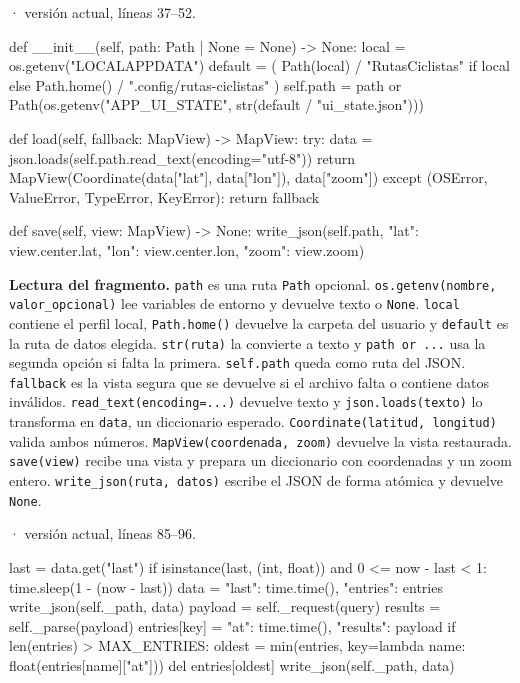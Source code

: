 \documentclass[11pt,a4paper]{article}
\begin{document}
\smallskip
{\footnotesize\texttt{} · versión actual, líneas 37--52.}\par
\begin{Codigo}[firstnumber=37]
    def __init__(self, path: Path | None = None) -> None:
        local = os.getenv("LOCALAPPDATA")
        default = (
            Path(local) / "RutasCiclistas" if local else Path.home() / ".config/rutas-ciclistas"
        )
        self.path = path or Path(os.getenv("APP_UI_STATE", str(default / "ui_state.json")))

    def load(self, fallback: MapView) -> MapView:
        try:
            data = json.loads(self.path.read_text(encoding="utf-8"))
            return MapView(Coordinate(data["lat"], data["lon"]), data["zoom"])
        except (OSError, ValueError, TypeError, KeyError):
            return fallback

    def save(self, view: MapView) -> None:
        write_json(self.path, {"lat": view.center.lat, "lon": view.center.lon, "zoom": view.zoom})
\end{Codigo}

\textbf{Lectura del fragmento.} \texttt{path} es una ruta \texttt{Path} opcional. \texttt{os.getenv(nombre, valor\_opcional)} lee variables de entorno y devuelve texto o \texttt{None}. \texttt{local} contiene el perfil local, \texttt{Path.home()} devuelve la carpeta del usuario y \texttt{default} es la ruta de datos elegida. \texttt{str(ruta)} la convierte a texto y \texttt{path or ...} usa la segunda opción si falta la primera. \texttt{self.path} queda como ruta del JSON. \texttt{fallback} es la vista segura que se devuelve si el archivo falta o contiene datos inválidos. \texttt{read\_text(encoding=...)} devuelve texto y \texttt{json.loads(texto)} lo transforma en \texttt{data}, un diccionario esperado. \texttt{Coordinate(latitud, longitud)} valida ambos números. \texttt{MapView(coordenada, zoom)} devuelve la vista restaurada. \texttt{save(view)} recibe una vista y prepara un diccionario con coordenadas y un zoom entero. \texttt{write\_json(ruta, datos)} escribe el JSON de forma atómica y devuelve \texttt{None}.


\smallskip
{\footnotesize\texttt{} · versión actual, líneas 85--96.}\par
\begin{Codigo}[firstnumber=85]
                last = data.get("last")
                if isinstance(last, (int, float)) and 0 <= now - last < 1:
                    time.sleep(1 - (now - last))
                data = {"last": time.time(), "entries": entries}
                write_json(self._path, data)
                payload = self._request(query)
                results = self._parse(payload)
                entries[key] = {"at": time.time(), "results": payload}
                if len(entries) > MAX_ENTRIES:
                    oldest = min(entries, key=lambda name: float(entries[name]["at"]))
                    del entries[oldest]
                write_json(self._path, data)
\end{Codigo}
\end{document}
